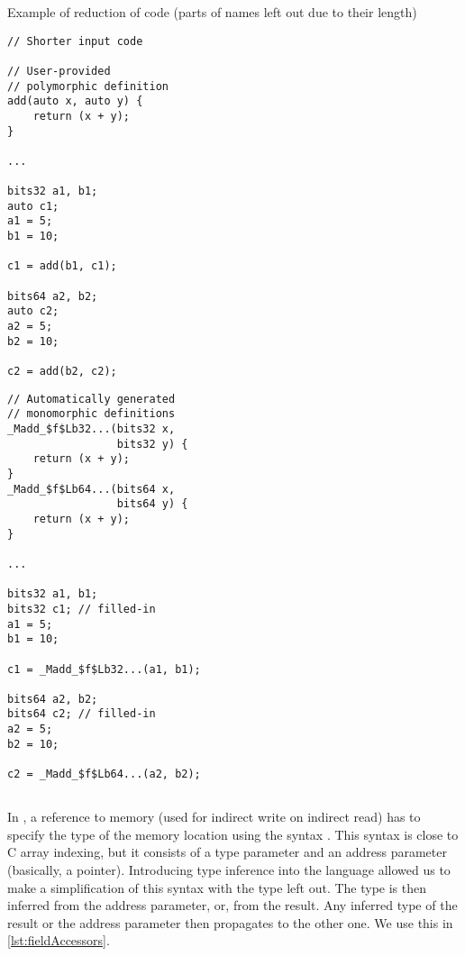 \begin{listing}
    \caption{Example of reduction of code (parts of names left out due to their length)}
    \label{lst:reduction}
    \begin{center}
    \begin{minipage}{0.5\linewidth}
    \begin{lstlisting}
// Shorter input code

// User-provided
// polymorphic definition
add(auto x, auto y) {
    return (x + y);
}

...

bits32 a1, b1;
auto c1;
a1 = 5;
b1 = 10;

c1 = add(b1, c1);

bits64 a2, b2;
auto c2;
a2 = 5;
b2 = 10;

c2 = add(b2, c2);
    \end{lstlisting}
    \end{minipage}%
    \begin{minipage}{0.5\linewidth}
    \begin{lstlisting}
// Automatically generated
// monomorphic definitions
_Madd_$f$Lb32...(bits32 x,
                 bits32 y) {
    return (x + y);
}
_Madd_$f$Lb64...(bits64 x,
                 bits64 y) {
    return (x + y);
}

...

bits32 a1, b1;
bits32 c1; // filled-in
a1 = 5;
b1 = 10;

c1 = _Madd_$f$Lb32...(a1, b1);

bits64 a2, b2;
bits64 c2; // filled-in
a2 = 5;
b2 = 10;

c2 = _Madd_$f$Lb64...(a2, b2);
    \end{lstlisting}
    \end{minipage}
    \end{center}
\end{listing}

\subsection{}

In \cmm{}, a reference to memory (used for indirect write on indirect read) has to specify the type of the memory location using the syntax . This syntax is close to C array indexing, but it consists of a type parameter and an address parameter (basically, a pointer). Introducing type inference into the language allowed us to make a simplification of this syntax with the type left out. The type is then inferred from the address parameter, or, from the result. Any inferred type of the result or the address parameter then propagates to the other one. We use this in \cref{lst:fieldAccessors}.

